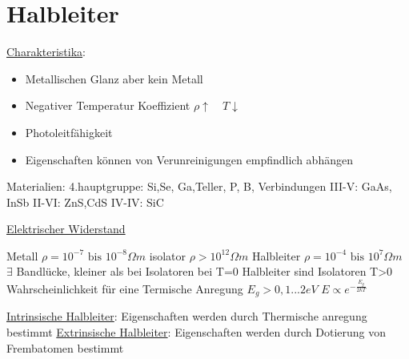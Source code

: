 


\tableofcontents
\setcounter{chapter}{10}
\chapter{Halbleiter}

\underline{Charakteristika}:

\begin{itemize}
\item Metallischen Glanz aber kein Metall
\item Negativer Temperatur Koeffizient \(\rho\uparrow \quad T\downarrow\)
\item Photoleitfähigkeit
\item Eigenschaften können von Verunreinigungen empfindlich abhängen
\end{itemize}

 Materialien:
4.hauptgruppe: Si,Se, Ga,Teller, P, B,
Verbindungen III-V: GaAs, InSb
II-VI: ZnS,CdS
IV-IV: SiC


\underline{Elektrischer Widerstand}

Metall \(\rho = 10^{-7} \text{ bis } 10^{-8}\Omega m\)
isolator \(\rho > 10^{12}\Omega m \)
Halbleiter \(\rho = 10^{-4} \text{ bis } 10^{7}\Omega m \)
\(\exists\) Bandlücke, kleiner als bei Isolatoren
bei T=0 Halbleiter sind Isolatoren
T>0 Wahrscheinlichkeit für eine Termische Anregung
\(E_g>0,1 ... 2eV\)
\(E\propto e^{-\frac{E_g}{2kT}}\)

\underline{Intrinsische Halbleiter}: Eigenschaften werden durch Thermische anregung bestimmt
\underline{Extrinsische Halbleiter}: Eigenschaften werden durch Dotierung von Frembatomen bestimmt


